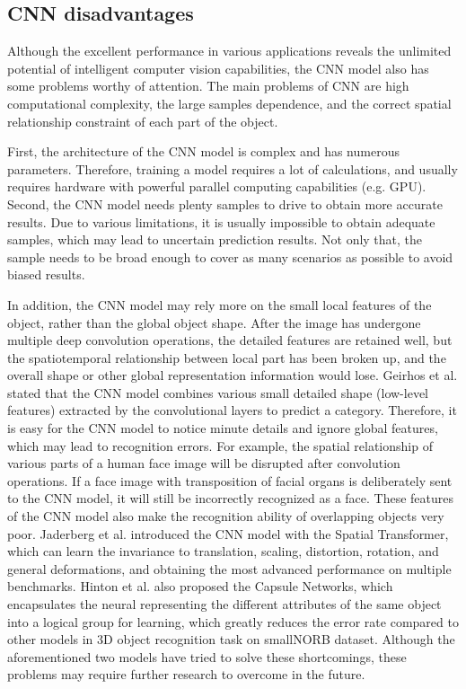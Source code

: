 \documentclass[10pt, a4paper]{article}
\begin{document}
\begin{multicols}{2}
	\section{CNN disadvantages} \justify
	Although the excellent performance in various applications reveals the unlimited potential of intelligent computer vision capabilities, the CNN model also has some problems worthy of attention. The main problems of CNN are high computational complexity, the large samples dependence, and the correct spatial relationship constraint of each part of the object.
	\par
	First, the architecture of the CNN model is complex and has numerous parameters. Therefore, training a model requires a lot of calculations, and usually requires hardware with powerful parallel computing capabilities (e.g. GPU). Second, the CNN model needs plenty samples to drive to obtain more accurate results. Due to various limitations, it is usually impossible to obtain adequate samples, which may lead to uncertain prediction results. Not only that, the sample needs to be broad enough to cover as many scenarios as possible to avoid biased results.
	\par
	In addition, the CNN model may rely more on the small local features of the object, rather than the global object shape. After the image has undergone multiple deep convolution operations, the detailed features are retained well, but the spatiotemporal relationship between local part has been broken up, and the overall shape or other global representation information would lose. Geirhos et al. \cite{geirhos2018imagenet} stated that the CNN model combines various small detailed shape (low-level features) extracted by the convolutional layers to predict a category. Therefore, it is easy for the CNN model to notice minute details and ignore global features, which may lead to recognition errors. For example, the spatial relationship of various parts of a human face image will be disrupted after convolution operations. If a face image with transposition of facial organs is deliberately sent to the CNN model, it will still be incorrectly recognized as a face. These features of the CNN model also make the recognition ability of overlapping objects very poor. Jaderberg et al. \cite{jaderberg2015spatial} introduced the CNN model with the Spatial Transformer, which can learn the invariance to translation, scaling, distortion, rotation, and general deformations, and obtaining the most advanced performance on multiple benchmarks. Hinton et al. \cite{hinton2018matrix} also proposed the Capsule Networks, which encapsulates the neural representing the different attributes of the same object into a logical group for learning, which greatly reduces the error rate compared to other models in 3D object recognition task on smallNORB \cite{lecun2004learning} dataset. Although the aforementioned two models have tried to solve these shortcomings, these problems may require further research to overcome in the future.


\end{multicols}
\end{document}
